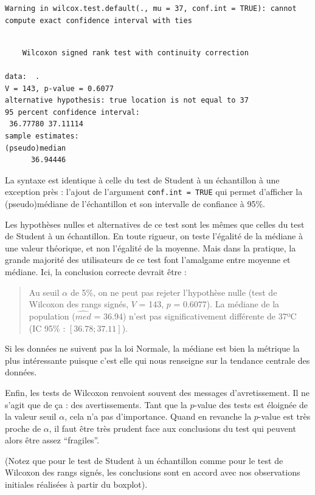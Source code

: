 \documentclass[a4paperpaper,]{article}
\begin{document}
\begin{verbatim}
Warning in wilcox.test.default(., mu = 37, conf.int = TRUE): cannot
compute exact confidence interval with ties
\end{verbatim}

\begin{verbatim}

    Wilcoxon signed rank test with continuity correction

data:  .
V = 143, p-value = 0.6077
alternative hypothesis: true location is not equal to 37
95 percent confidence interval:
 36.77780 37.11114
sample estimates:
(pseudo)median 
      36.94446 
\end{verbatim}

La syntaxe est identique à celle du test de Student à un échantillon à une exception près : l'ajout de l'argument \texttt{conf.int\ =\ TRUE} qui permet d'afficher la (pseudo)médiane de l'échantillon et son intervalle de confiance à 95\%.

Les hypothèses nulles et alternatives de ce test sont les mêmes que celles du test de Student à un échantillon. En toute rigueur, on teste l'égalité de la médiane à une valeur théorique, et non l'égalité de la moyenne. Mais dans la pratique, la grande majorité des utilisateurs de ce test font l'amalgame entre moyenne et médiane. Ici, la conclusion correcte devrait être :

\begin{quote}
Au seuil \(\alpha\) de 5\%, on ne peut pas rejeter l'hypothèse nulle (test de Wilcoxon des rangs signés, \(V\) = 143, \(p\) = 0.6077). La médiane de la population (\(\widehat{med}\) = 36.94) n'est pas significativement différente de 37ºC (IC 95\% : \([36.78 ; 37.11]\)).
\end{quote}

Si les données ne suivent pas la loi Normale, la médiane est bien la métrique la plus intéressante puisque c'est elle qui nous renseigne sur la tendance centrale des données.

Enfin, les tests de Wilcoxon renvoient souvent des messages d'avretissement. Il ne s'agit que de ça : des avertissements. Tant que la \(p\)-value des tests est éloignée de la valeur seuil \(\alpha\), cela n'a pas d'importance. Quand en revanche la \(p\)-value est très proche de \(\alpha\), il faut être très prudent face aux conclusions du test qui peuvent alors être assez ``fragiles''.

(Notez que pour le test de Student à un échantillon comme pour le test de Wilcoxon des rangs signés, les conclusions sont en accord avec nos observations initiales réalisées à partir du boxplot).
\end{document}
